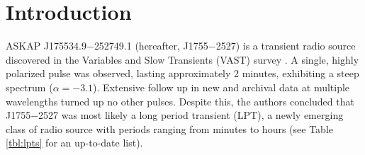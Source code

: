 \documentclass[preprint2,linenumbers]{aastex631}
\newcommand{\src}{J1755$-$2527}
\newcommand{\srcfull}{ASKAP J175534.9$-$252749.1}
\begin{document}
\begin{abstract}

  [Abstract goes here\dots]

\end{abstract}



\section{Introduction} \label{sec:introduction}

\srcfull{} (hereafter, \src{}) is a transient radio source discovered in the Variables and Slow Transients (VAST) survey \citep[][hereafter ]{2024MNRAS.535..909D}.
A single, highly polarized pulse was observed, lasting approximately 2 minutes, exhibiting a steep spectrum ($\alpha = -3.1$).
Extensive follow up in new and archival data at multiple wavelengths turned up no other pulses.
Despite this, the authors concluded that \src{} was most likely a long period transient (LPT), a newly emerging class of radio source with periods ranging from minutes to hours (see Table \ref{tbl:lpts} for an up-to-date list).
\end{document}

